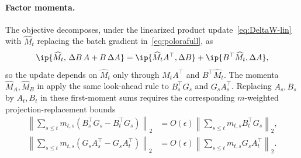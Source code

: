\paragraph{Factor momenta.} The objective decomposes, under the linearized
product update~\eqref{eq:DeltaW-lin} with $\widehat M_t$ replacing the batch
gradient in~\eqref{eq:polorafull}, as
\[
  \ip{\widehat M_t,\,\Delta B\,A+B\,\Delta A}
  =\ip{\widehat M_tA^\top,\Delta B}+\ip{B^\top\widehat M_t,\Delta A},
\]
so the update depends on $\widehat M_t$ only through $\widehat M_tA^\top$
and $B^\top\widehat M_t$. The momenta $\widehat M_A,\widehat M_B$ in
 apply the same look-ahead rule to $B_s^\top G_s$ and
$G_sA_s^\top$. Replacing $A_s,B_s$ by $A_t,B_t$ in these first-moment sums
requires the corresponding $m$-weighted projection-replacement bounds
\[
\begin{aligned}
  \left\|
    \sum_{s\le t}m_{t,s}(B_s^\top G_s-B_t^\top G_s)
  \right\|_2
  &=
  O(\epsilon)
  \left\|
    \sum_{s\le t}m_{t,s}B_t^\top G_s
  \right\|_2,\\
  \left\|
    \sum_{s\le t}m_{t,s}(G_sA_s^\top-G_sA_t^\top)
  \right\|_2
  &=
  O(\epsilon)
  \left\|
    \sum_{s\le t}m_{t,s}G_sA_t^\top
  \right\|_2 .
\end{aligned}
\]

